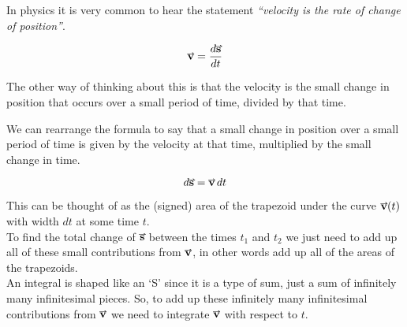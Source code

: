 \documentclass[main.tex]{subfiles}
\begin{document}
                In physics it is very common to hear the statement \textit{``velocity is the rate of change of position''}.
                
                \begin{equation*}
                    \vect{v} = \frac{d\vect{s}}{dt}
                \end{equation*}

                The other way of thinking about this is that the velocity is the small change in position that occurs over a small period of time, divided by that time.

                We can rearrange the formula to say that a small change in position over a small period of time is given by the velocity at that time, multiplied by the small change in time.
                
                \begin{equation*}
                    d\vect{s} = \vect{v}\, dt
                \end{equation*}

                This can be thought of as the (signed) area of the trapezoid under the curve $\vect{v}(t)$ with width $dt$ at some time $t$.\\
                To find the total change of $\vect{s}$ between the times $t_1$ and $t_2$ we just need to add up all of these small contributions from $\vect{v}$, in other words add up all of the areas of the trapezoids.\\
                An integral is shaped like an `S' since it is a type of sum, just a sum of infinitely many infinitesimal pieces. So, to add up these infinitely many infinitesimal contributions from $\vect{v}$ we need to integrate $\vect{v}$ with respect to $t$.

        
\end{document}
